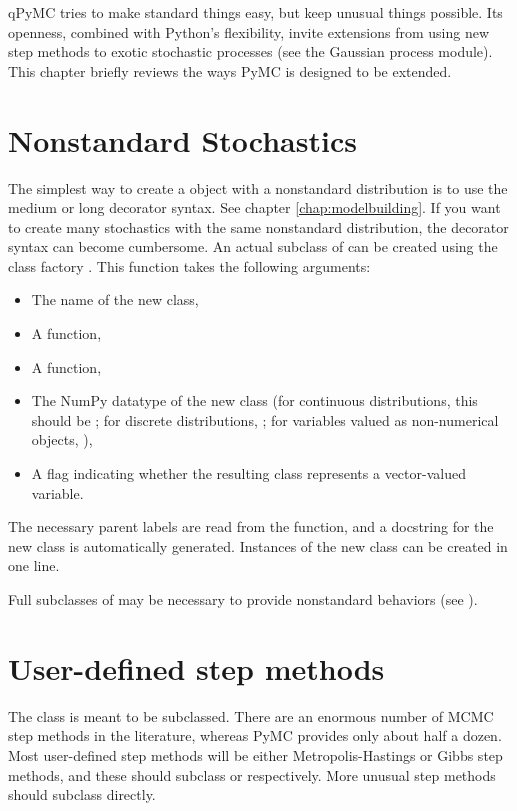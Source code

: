 qPyMC tries to make standard things easy, but keep unusual things possible. Its openness, combined with Python's flexibility, invite extensions from using new step methods to exotic stochastic processes (see the Gaussian process module). This chapter briefly reviews the ways PyMC is designed to be extended. 

\hypertarget{nonstandard}{}
\section{Nonstandard Stochastics} \label{nonstandard}

The simplest way to create a  object with a nonstandard distribution is to use the medium or long decorator syntax. See chapter \ref{chap:modelbuilding}. If you want to create many stochastics with the same nonstandard distribution, the decorator syntax can become cumbersome. An actual subclass of  can be created using the class factory . This function takes the following arguments:
\begin{itemize}
   \item The name of the new class,
   \item A  function,
   \item A  function,
   \item The NumPy datatype of the new class (for continuous distributions, this should be ; for discrete distributions, ; for variables valued as non-numerical objects, ),
   \item A flag indicating whether the resulting class represents a vector-valued variable.
\end{itemize}
The necessary parent labels are read from the  function, and a docstring for the new class is automatically generated. Instances of the new class can be created in one line.

Full subclasses of  may be necessary to provide nonstandard behaviors (see ).

\hypertarget{custom-stepper}{}
\section{User-defined step methods} \label{custom-stepper}
The  class is meant to be subclassed. There are an enormous number of MCMC step methods in the literature, whereas PyMC provides only about half a dozen. Most user-defined step methods will be either Metropolis-Hastings or Gibbs step methods, and these should subclass  or  respectively. More unusual step methods should subclass  directly.

